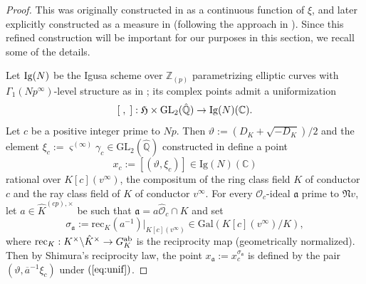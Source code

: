 \documentclass[10pt]{amsart}
\numberwithin{equation}{section}
\theoremstyle{definition}
\theoremstyle{remark}
\newcommand{\Z}{\mathbb{Z}}
\newcommand{\Q}{\mathbb{Q}}
\begin{document}
\begin{proof}
This was originally constructed in \cite{BDP} as a continuous function of $\xi$, and later explicitly constructed as a measure in \cite{cas-hsieh1} (following the approach in \cite{brakocevic}). Since this refined construction will be important for our purposes in this section, we recall some of the details. 

Let ${\rm Ig}(N)$ be the Igusa scheme over $\Z_{(p)}$ parametrizing elliptic curves with $\Gamma_1(Np^\infty)$-level structure as in \cite[\S{2.1}]{cas-hsieh1};  its complex points admit a uniformization 
\begin{equation}\label{eq:unif}
[\;,\;]:\mathfrak{H}\times{\rm GL}_2(\hat{\Q})\rightarrow{\rm Ig}(N)(\mathbb{C}).
\end{equation} 
Let $c$ be a positive integer prime to $Np$. Then $\vartheta:=(D_K+\sqrt{-D_K})/2$ and the element $\xi_c:=\varsigma^{(\infty)}\gamma_c\in\mathrm{GL}_2(\hat{\mathbb{Q}}^{})$ constructed in \cite[p.~577]{cas-hsieh1} define a point 
\[
x_c:=[(\vartheta,\xi_c)]\in\mathrm{Ig}(N)(\mathbb{C})
\]
rational over $K[c](v^\infty)$, the compositum of the ring class field $K$ of conductor $c$ and the ray class field of $K$ of conductor $v^\infty$. For every $\mathcal{O}_c$-ideal $\mathfrak{a}$ prime to $\mathfrak{N}v$, let $a\in\hat{K}^{(cp),\times}$ be such that $\mathfrak{a}=a\hat{\mathcal{O}}_c\cap K$ and set
\[
\sigma_\mathfrak{a}:=\mathrm{rec}_K(a^{-1})\vert_{K[c](v^\infty)}\in\mathrm{Gal}(K[c](v^\infty)/K),
\]
where ${\rm rec}_K:K^\times\backslash\hat{K}^\times\rightarrow G_K^{\rm ab}$ is the reciprocity map (geometrically normalized). Then by Shimura's reciprocity law, the point $x_\mathfrak{a}:=x_c^{\sigma_\mathfrak{a}}$ is defined by the pair $(\vartheta,\overline{a}^{-1}\xi_c)$ under $(\ref{eq:unif})$.  


\end{proof}
\end{document}
